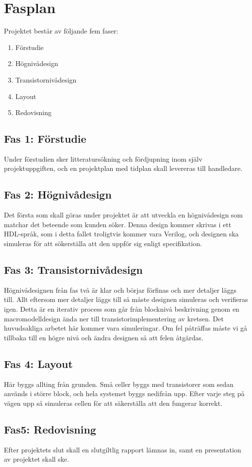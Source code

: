 \section{Fasplan}
Projektet består av följande fem faser:
\begin{enumerate}
\item Förstudie
\item Högnivådesign
\item Transistornivådesign
\item Layout
\item Redovisning
\end{enumerate}

\subsection{Fas 1: Förstudie}
Under förstudien sker litteratursökning och fördjupning inom själv projektuppgiften, och en projektplan med tidplan skall levereras till handledare. 

\subsection{Fas 2: Högnivådesign}

Det första som skall göras under projektet är att utveckla en högnivådesign som matchar det beteende som kunden söker. Denna design kommer skrivas i ett HDL-språk, som i detta fallet troligtvis kommer vara Verilog, och designen ska simuleras för att sökerställa att den uppför sig enligt specifikation.

\subsection{Fas 3: Transistornivådesign}

Högnivådesignen från fas två är klar och börjar förfinas och mer detaljer läggs till. Allt eftersom mer detaljer läggs till så måste designen simuleras och verifieras igen. Detta är en iterativ process som går från blocknivå beskrivning genom en macromodelldesign ända ner till transistorimplementering av kretsen. Det huvudsakliga arbetet här kommer vara simuleringar. Om fel påträffas måste vi gå tillbaka till en högre nivå och ändra designen så att felen åtgärdas.

\subsection{Fas 4: Layout}

Här byggs allting från grunden. Små celler byggs med transistorer som sedan används i större block, och hela systemet byggs nedifrån upp. Efter varje steg på vägen upp så simuleras cellen för att säkerställa att den fungerar korrekt.

\subsection{Fas5: Redovisning}
Efter projektets slut skall en slutgiltlig rapport lämnas in, samt en presentation av projektet skall ske. 
